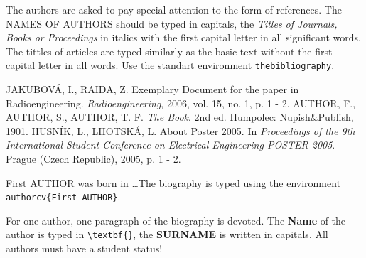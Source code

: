 \documentclass{poster15}
\begin{document}
The authors are asked to pay special attention to the form of references. The NAMES OF AUTHORS should be typed in capitals, the \emph{Titles of Journals, Books or Proceedings} in italics with the first capital letter in all significant words. The tittles of articles are typed similarly as the basic text without the first capital letter in all words. Use the standart environment \verb+thebibliography+.

\begin{thebibliography}{9}
JAKUBOV\'A, I., RAIDA, Z. Exemplary Document for the paper in Radioengineering. \emph{Radioengineering}, 2006, vol. 15, no. 1, p. 1 - 2.
AUTHOR, F., AUTHOR, S., AUTHOR, T. F. \emph{The Book}. 2nd ed. Humpolec: Nupish\&Publish, 1901.
HUSN\'IK, L., LHOTSK\'A, L. About Poster 2005. In \emph{Proceedings of the 9th International Student Conference on Electrical Engineering POSTER 2005}. Prague (Czech Republic), 2005, p. 1 - 2.
\end{thebibliography}


\begin{authorcv}{First AUTHOR}
was born in \dots The biography is typed using the environment \verb+authorcv{First AUTHOR}+. 

For one author, one paragraph of the biography is devoted. The \textbf{Name} of the author is typed in  \verb+\textbf{}+, the \textbf{SURNAME} is written in capitals.  All authors must have a student status!
\end{authorcv}
\end{document}
